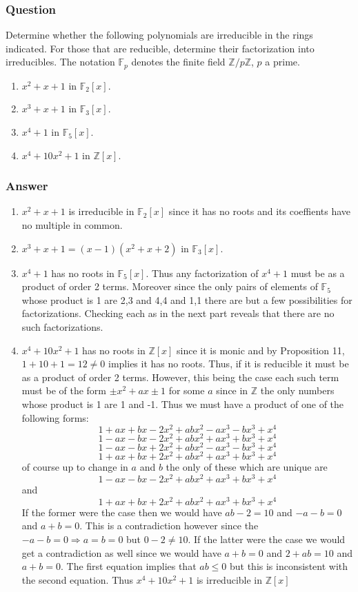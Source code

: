 \documentclass[12pt]{article}
\begin{document}
\subsubsection{Question}
Determine whether the following polynomials are irreducible in the rings indicated. For those that are reducible, determine their factorization into irreducibles. The notation $\mathbb{F}_p$ denotes the finite field $\mathbb{Z}/p\mathbb{Z}$, $p$ a prime.
\begin{enumerate}
\item $x^2+x+1$ in $\mathbb{F}_2[x]$.
\item $x^3+x+1$ in $\mathbb{F}_3[x]$.
\item $x^4+1$ in $\mathbb{F}_5[x]$.
\item $x^4+10x^2+1$ in $\mathbb{Z}[x]$.
\end{enumerate}
\subsubsection{Answer}
\begin{enumerate}
\item $x^2+x+1$ is irreducible in $\mathbb{F}_2[x]$ since it has no roots and its coeffients have no multiple in common.
\item $x^3+x+1 =(x-1)(x^2+x+2)$ in $\mathbb{F}_3[x]$.
\item $x^4+1$ has no roots in $\mathbb{F}_5[x]$. Thus any factorization of $x^4+1$ must be as a product of order 2 terms. Moreover  since the only pairs of  elements of $\mathbb{F}_5$ whose product is 1 are 2,3 and 4,4 and 1,1 there are but a few possibilities for factorizations. Checking each as in the next part reveals that there are no such factorizations. 
\item $x^4+10x^2+1$ has no roots in $\mathbb{Z}[x]$ since it is monic and by Proposition 11, $1+10+1 =12 \neq 0 $ implies it has no roots. Thus, if it is reducible it must be as a product of order 2 terms. However, this being the case each such term must be of the form $\pm x^2+a x \pm 1$ for some $a$ since in $\mathbb{Z}$ the only numbers whose product is 1 are 1 and -1. Thus we must have a product of one of the following forms:
\[1+a x+b x-2 x^2+a b x^2-a x^3-b x^3+x^4\]
\[1-a x-b x-2 x^2+a b x^2+a x^3+b x^3+x^4\]
\[1-a x-b x+2 x^2+a b x^2-a x^3-b x^3+x^4\]
\[1+a x+b x+2 x^2+a b x^2+a x^3+b x^3+x^4\]
of course up to change in $a$ and $b$ the only of these which are unique are 
\[1-a x-b x-2 x^2+a b x^2+a x^3+b x^3+x^4\]
and
\[1+a x+b x+2 x^2+a b x^2+a x^3+b x^3+x^4\]
If the former were the case then we would have $ab-2=10$ and $-a-b=0$ and $a+b=0$. This is a contradiction however since the $-a-b=0 \Rightarrow a=b=0$ but $0-2\neq 10$. If the latter were the case we would get a contradiction as well since we would have $a+b=0$ and $2+ab=10$ and $a+b=0$. The first equation implies that $ a b \leq 0$ but this is inconsistent with the second equation. Thus $x^4+10x^2+1$ is irreducible in $\mathbb{Z}[x]$
\end{enumerate}
\end{document}
